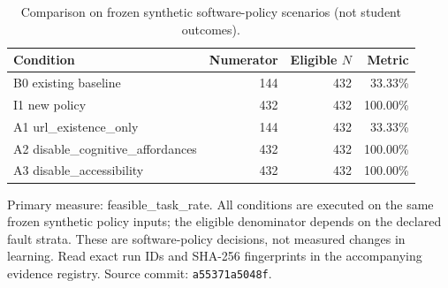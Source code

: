 \begin{table}[htbp]
\centering
\small
\caption{Comparison on frozen synthetic software-policy scenarios (not student outcomes).}
\label{tab:ln-07-policy-benchmark}
\begin{tabular}{lrrr}
\toprule
Condition & Numerator & Eligible $N$ & Metric \\
\midrule
B0 existing baseline & 144 & 432 & 33.33\% \\
I1 new policy & 432 & 432 & 100.00\% \\
A1 url\_existence\_only & 144 & 432 & 33.33\% \\
A2 disable\_cognitive\_affordances & 432 & 432 & 100.00\% \\
A3 disable\_accessibility & 432 & 432 & 100.00\% \\
\bottomrule
\end{tabular}
\par\smallskip
\begin{minipage}{0.98\linewidth}\footnotesize
Primary measure: feasible\_task\_rate. All conditions are executed on the same frozen synthetic policy inputs; the eligible denominator depends on the declared fault strata. These are software-policy decisions, not measured changes in learning. Read exact run IDs and SHA-256 fingerprints in the accompanying evidence registry. Source commit: \texttt{a55371a5048f}.
\end{minipage}
\end{table}
